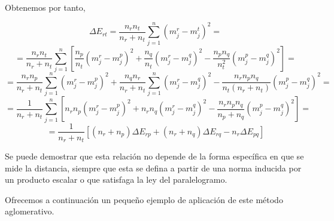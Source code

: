 Obtenemos por tanto,

\[
\Delta E_{rt} = \frac{n_{r}n_{t}}{n_{r}+n_{t}} \sum_{j=1}^{n} (m^{r}_{j}-m^{t}_{j})^{2} = 
\]
\[
= \frac{n_{r}n_{t}}{n_{r}+n_{t}}\sum_{j=1}^{n} \left[\frac{n_{p}}{n_{t}}(m^{r}_{j} - m^{p}_{j})^{2} + \frac{n_{q}}{n_{t}}(m^{r}_{j} - m^{q}_{j})^{2} - \frac{n_{p}n_{q}}{n_{t}^{2}}(m^{p}_{j}-m^{q}_{j})^{2}\right] = 
\]
\[
= \frac{n_{r}n_{p}}{n_{r}+n_{t}}\sum_{j=1}^{n} (m^{r}_{j} - m^{p}_{j})^{2} + \frac{n_{q}n_{r}}{n_{r}+n_{t}}\sum_{j=1}^{n}(m^{r}_{j} - m^{q}_{j})^{2} - \frac{n_{r}n_{p}n_{q}}{n_{t}(n_{r}+n_{t})}(m^{p}_{j}-m^{q}_{j})^{2} = 
\]
\[
= \frac{1}{n_{r}+n_{t}}\sum_{j=1}^{n}\left[n_{r}n_{p}(m^{r}_{j}-m^{p}_{j})^{2} + n_{r}n_{q}(m^{r}_{j}-m^{q}_{j})^{2} - \frac{n_{r}n_{p}n_{q}}{n_{p}+n_{q}}(m^{p}_{j}-m^{q}_{j})^{2}\right] =
\]
\[
= \frac{1}{n_{r}+n_{t}}[(n_{r}+n_{p})\Delta E_{rp} + (n_{r}+n_{q})\Delta E_{rq} - n_{r}\Delta E_{pq}]
\]

\vspace{0.5cm}

\begin{nota}
    Se puede demostrar que esta relación no depende de la forma específica en que se mide la distancia, siempre que esta se defina a partir de 
    una norma inducida por un producto escalar o que satisfaga la ley del paralelogramo.
\end{nota}

\vspace{0.5cm}

Ofrecemos a continuación un pequeño ejemplo de aplicación de este método aglomerativo.

